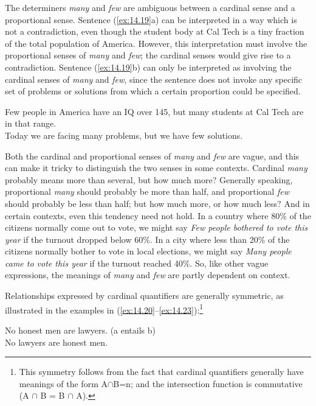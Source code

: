 The determiners \textit{many} and \textit{few} are ambiguous between a cardinal sense and a proportional sense. Sentence (\ref{ex:14.19}a) can be interpreted in a way which is not a contradiction, even though the student body at Cal Tech is a tiny fraction of the total population of America. However, this interpretation must involve the proportional senses of \textit{many} and \textit{few}; the cardinal senses would give rise to a contradiction. Sentence (\ref{ex:14.19}b) can only be interpreted as involving the cardinal senses of \textit{many} and \textit{few}, since the sentence does not invoke any specific set of problems or solutions from which a certain proportion could be specified.


\ea \label{ex:14.19}
\ea Few people in America have an IQ over 145, but many students at Cal Tech are in that range.\\
\ex Today we are facing many problems, but we have few solutions.
                       \z
\z


Both the cardinal and proportional senses of \textit{many} and \textit{few} are vague, and this can make it tricky to distinguish the two senses in some contexts. Cardinal \textit{many} probably means more than several, but how much more? Generally speaking, proportional \textit{many} should probably be more than half, and proportional \textit{few} should probably be less than half; but how much more, or how much less? And in certain contexts, even this tendency need not hold. In a country where 80\% of the citizens normally come out to vote, we might say \textit{Few people bothered to vote this year} if the turnout dropped below 60\%. In a city where less than 20\% of the citizens normally bother to vote in local elections, we might say \textit{Many people came to vote this year} if the turnout reached 40\%. So, like other vague expressions, the meanings of \textit{many} and \textit{few} are partly dependent on context.


\newpage 
Relationships expressed by cardinal quantifiers are generally symmetric, as illustrated in the examples in (\ref{ex:14.20}--\ref{ex:14.23}):\footnote{This symmetry follows from the fact that cardinal quantifiers generally have meanings of the form {\textbar}A${\cap}$B{\textbar}=n; and the intersection function is commutative (A ${\cap}$ B = B ${\cap}$ A).}


\ea \label{ex:14.20}
\ea No honest men are lawyers. \hfill  (a entails b)\\
\ex No lawyers are honest men.
                       \z
\z


